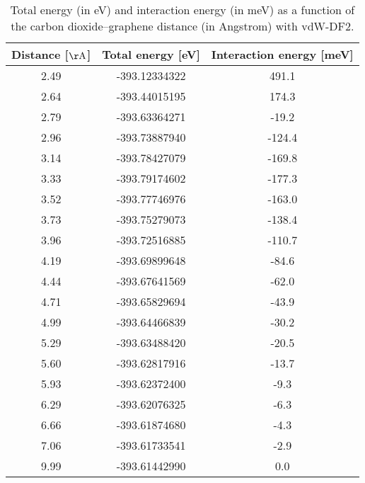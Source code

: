 \begin{table}[h]
\centering
\begin{tabular}{ccc}
\hline
Distance [$\mathrm{\AA}$] & Total energy [eV] & Interaction energy [meV] \\
\hline
2.49 & -393.12334322 & 491.1 \\
2.64 & -393.44015195 & 174.3 \\
2.79 & -393.63364271 & -19.2 \\
2.96 & -393.73887940 & -124.4 \\
3.14 & -393.78427079 & -169.8 \\
3.33 & -393.79174602 & -177.3 \\
3.52 & -393.77746976 & -163.0 \\
3.73 & -393.75279073 & -138.4 \\
3.96 & -393.72516885 & -110.7 \\
4.19 & -393.69899648 & -84.6 \\
4.44 & -393.67641569 & -62.0 \\
4.71 & -393.65829694 & -43.9 \\
4.99 & -393.64466839 & -30.2 \\
5.29 & -393.63488420 & -20.5 \\
5.60 & -393.62817916 & -13.7 \\
5.93 & -393.62372400 & -9.3 \\
6.29 & -393.62076325 & -6.3 \\
6.66 & -393.61874680 & -4.3 \\
7.06 & -393.61733541 & -2.9 \\
9.99 & -393.61442990 & 0.0 \\
\hline
\end{tabular}
\caption{Total energy (in eV) and interaction energy (in meV) as a function of the carbon dioxide--graphene distance (in Angstrom) with vdW-DF2.}
\label{SI_dft_table_vdW-DF2}
\end{table}